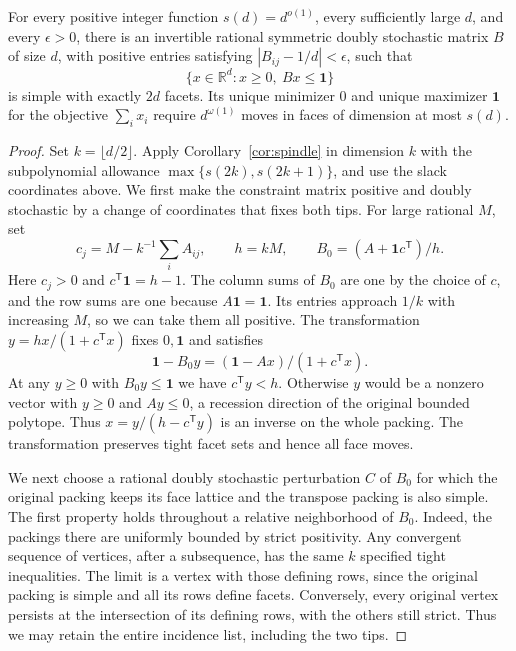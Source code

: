 \begin{corollary}\label{cor:packing}
For every positive integer function $s(d)=d^{o(1)}$, every sufficiently
large $d$, and every $\epsilon>0$, there is an invertible rational
symmetric doubly stochastic matrix $B$ of size $d$, with positive
entries satisfying $|B_{ij}-1/d|<\epsilon$, such that
\[
      \{x\in\mathbb R^d:x\ge0,\ Bx\le\mathbf1\}
\]
is simple with exactly $2d$ facets. Its unique minimizer $0$ and
unique maximizer $\mathbf1$ for the objective $\sum_i x_i$ require
$d^{\omega(1)}$ moves in faces of dimension at most $s(d)$.
\end{corollary}

\begin{proof}
Set $k=\lfloor d/2\rfloor$. Apply Corollary~\ref{cor:spindle} in
dimension $k$ with the subpolynomial allowance
$\max\{s(2k),s(2k+1)\}$, and use the slack coordinates above.
We first make the constraint matrix positive and doubly stochastic
by a change of coordinates that fixes both tips. For large rational
$M$, set
\[
 c_j=M-k^{-1}\sum_i A_{ij},\qquad h=kM,\qquad
 B_0=(A+\mathbf1c^{\mathsf T})/h .
\]
Here $c_j>0$ and $c^{\mathsf T}\mathbf1=h-1$. The column sums of $B_0$
are one by the choice of $c$, and the row sums are one because
$A\mathbf1=\mathbf1$. Its entries approach $1/k$ with increasing $M$,
so we can take them all positive. The transformation
$y=hx/(1+c^{\mathsf T}x)$ fixes $0,\mathbf1$ and satisfies
\[
              \mathbf1-B_0y
              =(\mathbf1-Ax)/(1+c^{\mathsf T}x).
\]
At any $y\ge0$ with $B_0y\le\mathbf1$ we have $c^{\mathsf T}y<h$.
Otherwise $y$ would be a nonzero vector with $y\ge0$ and $Ay\le0$,
a recession direction of the original bounded polytope. Thus
$x=y/(h-c^{\mathsf T}y)$ is an inverse on the whole packing. The
transformation preserves tight facet sets and hence all face moves.

We next choose a rational doubly stochastic perturbation $C$ of $B_0$
for which the original packing keeps its face lattice and the transpose
packing is also simple. The first property holds throughout a relative
neighborhood of $B_0$. Indeed, the packings there are uniformly bounded
by strict positivity. Any convergent sequence of vertices, after a
subsequence, has the same $k$ specified tight inequalities. The limit is
a vertex with those defining rows, since the original packing is simple
and all its rows define facets. Conversely, every original vertex persists
at the intersection of its defining rows, with the others still strict.
Thus we may retain the entire incidence list, including the two tips.


\end{proof}
